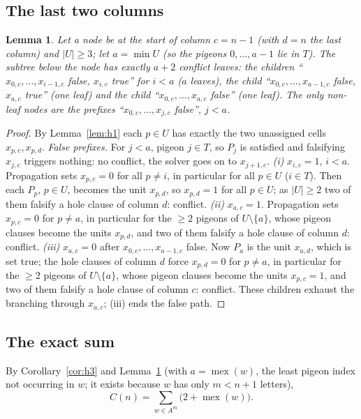 \documentclass[11pt]{article}
\newtheorem{lemma}{Lemma}
\theoremstyle{definition}
\theoremstyle{remark}
\newcommand{\mex}{\operatorname{mex}}
\begin{document}
\subsection{The last two columns}
\begin{lemma}\label{lem:h4}
Let a node be at the start of column $c=n-1$ (with $d=n$ the last column) and $|U|\ge3$; let
$a=\min U$ (so the pigeons $0,\dots,a-1$ lie in $T$). The subtree below the node has exactly $a+2$
conflict leaves: the children ``$x_{0,c},\dots,x_{i-1,c}$ false, $x_{i,c}$ true'' for $i<a$ ($a$ leaves),
the child ``$x_{0,c},\dots,x_{a-1,c}$ false, $x_{a,c}$ true'' (one leaf) and the child
``$x_{0,c},\dots,x_{a,c}$ false'' (one leaf). The only non-leaf nodes are the prefixes
``$x_{0,c},\dots,x_{j,c}$ false'', $j<a$.
\end{lemma}
\begin{proof}
By Lemma~\ref{lem:h1} each $p\in U$ has exactly the two unassigned cells $x_{p,c},x_{p,d}$.
\emph{False prefixes.} For $j<a$, pigeon $j\in T$, so $P_j$ is satisfied and falsifying $x_{j,c}$
triggers nothing: no conflict, the solver goes on to $x_{j+1,c}$.
\emph{(i)} $x_{i,c}=1$, $i<a$. Propagation sets $x_{p,c}=0$ for all $p\ne i$, in particular for all
$p\in U$ ($i\in T$). Then each $P_p$, $p\in U$, becomes the unit $x_{p,d}$, so $x_{p,d}=1$ for all
$p\in U$; as $|U|\ge2$ two of them falsify a hole clause of column $d$: conflict.
\emph{(ii)} $x_{a,c}=1$. Propagation sets $x_{p,c}=0$ for $p\ne a$, in particular for the $\ge2$ pigeons of
$U\setminus\{a\}$, whose pigeon clauses become the units $x_{p,d}$, and two of them falsify a hole clause
of column $d$: conflict.
\emph{(iii)} $x_{a,c}=0$ after $x_{0,c},\dots,x_{a-1,c}$ false. Now $P_a$ is the unit $x_{a,d}$, which is
set true; the hole clauses of column $d$ force $x_{p,d}=0$ for $p\ne a$, in particular for the $\ge2$
pigeons of $U\setminus\{a\}$, whose pigeon clauses become the units $x_{p,c}=1$, and two of them
falsify a hole clause of column $c$: conflict.
These children exhaust the branching through $x_{a,c}$; (iii) ends the false path.
\end{proof}

\subsection{The exact sum}
By Corollary~\ref{cor:h3} and Lemma~\ref{lem:h4} (with $a=\mex(w)$, the least pigeon index not occurring in
$w$; it exists because $w$ has only $m<n+1$ letters),
\begin{equation}\label{eq:sum}
C(n)=\sum_{w\in A^m}\bigl(2+\mex(w)\bigr).
\end{equation}
\end{document}
